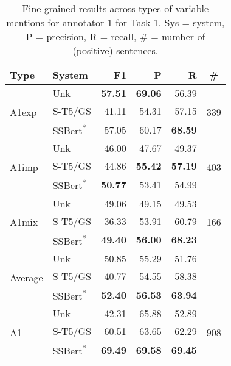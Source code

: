 \documentclass[11pt]{article}
\begin{document}
\begin{table*}[]
    \centering
    \begin{tabular}{l|l|r|r|r|c}
    Type &     System &     F1 &      P &      R &  \# \\
    \hline
    \hline
    \multirow{3}{3em}{A1exp} & Unk &  \textbf{57.51} &  \textbf{69.06} &  56.39 &  \multirow{3}{2em}{339} \\
      &  S-T5/GS  &  41.11 &  54.31 &  57.15 &   \\
       &  SSBert\textsuperscript{*}  &  57.05 &  60.17 &  \textbf{68.59} &   \\
    \hline
    \multirow{3}{3em}{A1imp} & Unk &  46.00 &  47.67 &  49.37 &  \multirow{3}{2em}{403} \\
      &  S-T5/GS  &  44.86 &  \textbf{55.42} &  \textbf{57.19} &   \\
       &  SSBert\textsuperscript{*}  &  \textbf{50.77} &  53.41 &  54.99 &   \\
    \hline
    \multirow{3}{3em}{A1mix} & Unk &  49.06 &  49.15 &  49.53 &  \multirow{3}{2em}{166} \\
      &  S-T5/GS  &  36.33 &  53.91 &  60.79 &   \\
       &  SSBert\textsuperscript{*}  &  \textbf{49.40} &  \textbf{56.00} &  \textbf{68.23} &   \\
    \hline
    \multirow{3}{3em}{Average} & Unk &  50.85 &  55.29 &  51.76 &   \\
      &  S-T5/GS  &  40.77 &  54.55 &  58.38 &   \\
       &  SSBert\textsuperscript{*}  &  \textbf{52.40} &  \textbf{56.53} &  \textbf{63.94} &   \\
    \hline
    \multirow{3}{3em}{A1} & Unk &  42.31 &  65.88 &  52.89 &  \multirow{3}{2em}{908} \\
      &  S-T5/GS  &  60.51 &  63.65 &  62.29 &   \\
       &  SSBert\textsuperscript{*}  &  \textbf{69.49} &  \textbf{69.58} &  \textbf{69.45} &   \\
    \hline
    \end{tabular}
    \caption{Fine-grained results across types of variable mentions for annotator 1 for Task 1. Sys = system, P = precision, R = recall, \# = number of (positive) sentences.}
    \label{tab:T1-Ann1}
\end{table*}
\end{document}

